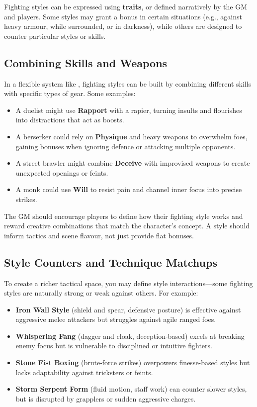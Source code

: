 \begin{multicols}{2}
Fighting styles can be expressed using \textbf{traits}, or defined narratively by the GM and players. Some styles may grant a bonus in certain situations (e.g., against heavy armour, while surrounded, or in darkness), while others are designed to counter particular styles or skills.

\subsection*{Combining Skills and Weapons}

In a flexible system like \wyrd, fighting styles can be built by combining different skills with specific types of gear. Some examples:

\begin{itemize}
  \item A duelist might use \textbf{Rapport} with a rapier, turning insults and flourishes into distractions that act as boosts.
  \item A berserker could rely on \textbf{Physique} and heavy weapons to overwhelm foes, gaining bonuses when ignoring defence or attacking multiple opponents.
  \item A street brawler might combine \textbf{Deceive} with improvised weapons to create unexpected openings or feints.
  \item A monk could use \textbf{Will} to resist pain and channel inner focus into precise strikes.
\end{itemize}

The GM should encourage players to define how their fighting style works and reward creative combinations that match the character’s concept. A style should inform tactics and scene flavour, not just provide flat bonuses.

\subsection*{Style Counters and Technique Matchups}

To create a richer tactical space, you may define style interactions—some fighting styles are naturally strong or weak against others. For example:

\begin{itemize}
  \item \textbf{Iron Wall Style} (shield and spear, defensive posture) is effective against aggressive melee attackers but struggles against agile ranged foes.
  \item \textbf{Whispering Fang} (dagger and cloak, deception-based) excels at breaking enemy focus but is vulnerable to disciplined or intuitive fighters.
  \item \textbf{Stone Fist Boxing} (brute-force strikes) overpowers finesse-based styles but lacks adaptability against tricksters or feints.
  \item \textbf{Storm Serpent Form} (fluid motion, staff work) can counter slower styles, but is disrupted by grapplers or sudden aggressive charges.
\end{itemize}


\end{multicols}
